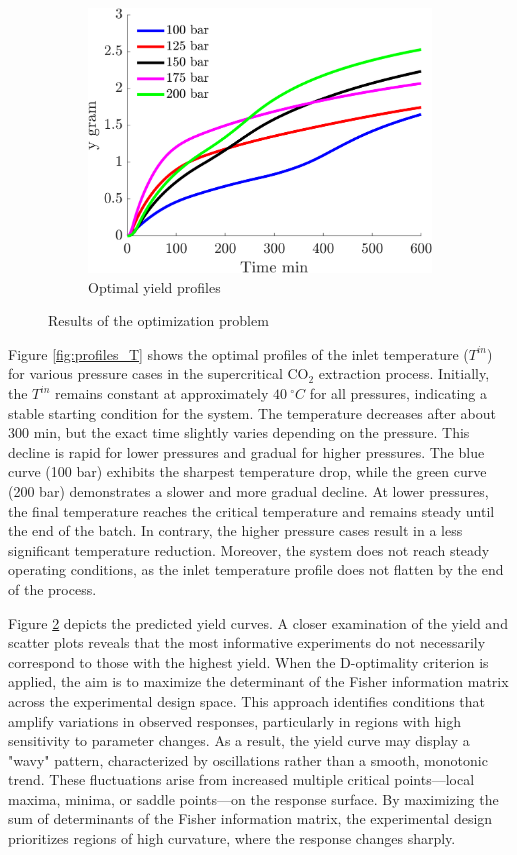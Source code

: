 \documentclass[../Article_Sensitivity_Analsysis.tex]{subfiles}
\begin{document}
\begin{figure}[t!]
		\begin{subfigure}[t]{\columnwidth}
			\centering
			\includegraphics[width=0.90\columnwidth]{Figures/Results/yield.png}	
			\caption{Optimal yield profiles}
			\label{fig:profiles_y}
		\end{subfigure}
		\caption{Results of the optimization problem}
	\end{figure}	
	
	Figure \ref{fig:profiles_T} shows the optimal profiles of the inlet temperature ($T^{in}$) for various pressure cases in the supercritical CO$_2$ extraction process. Initially, the $T^{in}$ remains constant at approximately $40~^\circ C$ for all pressures, indicating a stable starting condition for the system. The temperature decreases after about 300 min, but the exact time slightly varies depending on the pressure. This decline is rapid for lower pressures and gradual for higher pressures. The blue curve (100 bar) exhibits the sharpest temperature drop, while the green curve (200 bar) demonstrates a slower and more gradual decline. At lower pressures, the final temperature reaches the critical temperature and remains steady until the end of the batch. In contrary, the higher pressure cases result in a less significant temperature reduction. Moreover, the system does not reach steady operating conditions, as the inlet temperature profile does not flatten by the end of the process.

	Figure \ref{fig:profiles_y} depicts the predicted yield curves. A closer examination of the yield and scatter plots reveals that the most informative experiments do not necessarily correspond to those with the highest yield. When the D-optimality criterion is applied, the aim is to maximize the determinant of the Fisher information matrix across the experimental design space. This approach identifies conditions that amplify variations in observed responses, particularly in regions with high sensitivity to parameter changes. As a result, the yield curve may display a "wavy" pattern, characterized by oscillations rather than a smooth, monotonic trend. These fluctuations arise from increased multiple critical points—local maxima, minima, or saddle points—on the response surface. By maximizing the sum of determinants of the Fisher information matrix, the experimental design prioritizes regions of high curvature, where the response changes sharply. 
	
\end{document}
